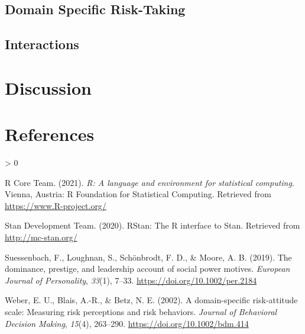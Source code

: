 \documentclass[
  english,
  man]{apa6}
\newlength{\cslhangindent}
\newenvironment{CSLReferences}[2] %
 {%
  \setlength{\parindent}{0pt}
  \ifodd #1 \everypar{\setlength{\hangindent}{\cslhangindent}}\ignorespaces\fi
  \ifnum #2 > 0
  \setlength{\parskip}{#2\baselineskip}
  \fi
 }%
 {}
\begin{document}
\hypertarget{domain-specific-risk-taking-1}{%
\subsection{Domain Specific Risk-Taking}\label{domain-specific-risk-taking-1}}

\hypertarget{interactions}{%
\subsection{Interactions}\label{interactions}}

\hypertarget{discussion}{%
\section{Discussion}\label{discussion}}

\newpage

\hypertarget{references}{%
\section{References}\label{references}}

\begingroup
\setlength{\parindent}{-0.5in}
\setlength{\leftskip}{0.5in}

\hypertarget{refs}{}
\begin{CSLReferences}{1}{0}
\leavevmode\hypertarget{ref-R-base}{}%
R Core Team. (2021). \emph{R: A language and environment for statistical computing}. Vienna, Austria: R Foundation for Statistical Computing. Retrieved from \url{https://www.R-project.org/}

\leavevmode\hypertarget{ref-rStan}{}%
Stan Development Team. (2020). {RStan}: The {R} interface to {Stan}. Retrieved from \url{http://mc-stan.org/}

\leavevmode\hypertarget{ref-suessenbach_dominance_2019}{}%
Suessenbach, F., Loughnan, S., Schönbrodt, F. D., \& Moore, A. B. (2019). The dominance, prestige, and leadership account of social power motives. \emph{European Journal of Personality}, \emph{33}(1), 7--33. \url{https://doi.org/10.1002/per.2184}

\leavevmode\hypertarget{ref-weber_domain-specific_2002}{}%
Weber, E. U., Blais, A.-R., \& Betz, N. E. (2002). A domain-specific risk-attitude scale: Measuring risk perceptions and risk behaviors. \emph{Journal of Behavioral Decision Making}, \emph{15}(4), 263--290. \url{https://doi.org/10.1002/bdm.414}

\end{CSLReferences}
\end{document}
